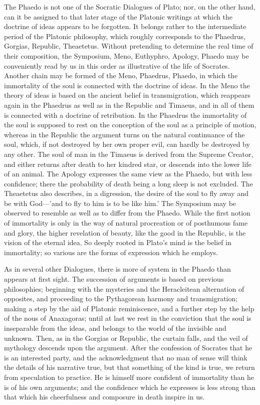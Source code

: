 The Phaedo is not one of the Socratic Dialogues of Plato; nor, on the
other hand, can it be assigned to that later stage of the Platonic
writings at which the doctrine of ideas appears to be forgotten. It
belongs rather to the intermediate period of the Platonic philosophy,
which roughly corresponds to the Phaedrus, Gorgias, Republic, Theaetetus.
Without pretending to determine the real time of their composition, the
Symposium, Meno, Euthyphro, Apology, Phaedo may be conveniently read by us
in this order as illustrative of the life of Socrates. Another chain may
be formed of the Meno, Phaedrus, Phaedo, in which the immortality of the
soul is connected with the doctrine of ideas. In the Meno the theory of
ideas is based on the ancient belief in transmigration, which reappears
again in the Phaedrus as well as in the Republic and Timaeus, and in all
of them is connected with a doctrine of retribution. In the Phaedrus the
immortality of the soul is supposed to rest on the conception of the soul
as a principle of motion, whereas in the Republic the argument turns on
the natural continuance of the soul, which, if not destroyed by her own
proper evil, can hardly be destroyed by any other. The soul of man in the
Timaeus is derived from the Supreme Creator, and either returns after
death to her kindred star, or descends into the lower life of an animal.
The Apology expresses the same view as the Phaedo, but with less
confidence; there the probability of death being a long sleep is not
excluded. The Theaetetus also describes, in a digression, the desire of
the soul to fly away and be with God—'and to fly to him is to be
like him.' The Symposium may be observed to resemble as well as to differ
from the Phaedo. While the first notion of immortality is only in the way
of natural procreation or of posthumous fame and glory, the higher
revelation of beauty, like the good in the Republic, is the vision of the
eternal idea. So deeply rooted in Plato's mind is the belief in
immortality; so various are the forms of expression which he employs.

As in several other Dialogues, there is more of system in the Phaedo than
appears at first sight. The succession of arguments is based on previous
philosophies; beginning with the mysteries and the Heracleitean
alternation of opposites, and proceeding to the Pythagorean harmony and
transmigration; making a step by the aid of Platonic reminiscence, and a
further step by the help of the nous of Anaxagoras; until at last we rest
in the conviction that the soul is inseparable from the ideas, and belongs
to the world of the invisible and unknown. Then, as in the Gorgias or
Republic, the curtain falls, and the veil of mythology descends upon the
argument. After the confession of Socrates that he is an interested party,
and the acknowledgment that no man of sense will think the details of his
narrative true, but that something of the kind is true, we return from
speculation to practice. He is himself more confident of immortality than
he is of his own arguments; and the confidence which he expresses is less
strong than that which his cheerfulness and composure in death inspire in
us.

